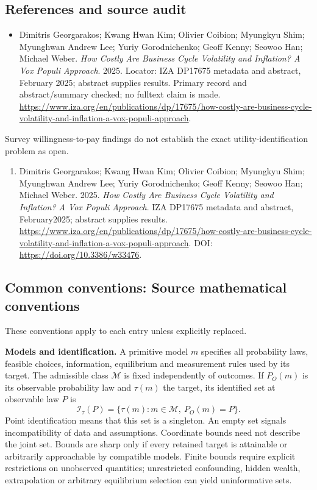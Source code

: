 \documentclass[11pt,a4paper]{article}
\begin{document}
\subsection*{References and source audit}
\begin{itemize}
\item Dimitris Georgarakos; Kwang Hwan Kim; Olivier Coibion; Myungkyu Shim; Myunghwan Andrew Lee; Yuriy Gorodnichenko; Geoff Kenny; Seowoo Han; Michael Weber. \emph{How Costly Are Business Cycle Volatility and Inflation? A Vox Populi Approach}. 2025. Locator: IZA DP17675 metadata and abstract, February 2025; abstract supplies results. Primary record and abstract/summary checked; no fulltext claim is made. \url{https://www.iza.org/en/publications/dp/17675/how-costly-are-business-cycle-volatility-and-inflation-a-vox-populi-approach}.
\end{itemize}
Survey willingness-to-pay findings do not establish the exact utility-identification problem as open.
\begin{enumerate}\raggedright
\item\hypertarget{definitions:source:30007518:1}{} Dimitris Georgarakos; Kwang Hwan Kim; Olivier Coibion; Myungkyu Shim; Myunghwan Andrew Lee; Yuriy Gorodnichenko; Geoff Kenny; Seowoo Han; Michael Weber. 2025. \emph{How Costly Are Business Cycle Volatility and Inflation? A Vox Populi Approach}. IZA DP17675 metadata and abstract, February2025; abstract supplies results.
\url{https://www.iza.org/en/publications/dp/17675/how-costly-are-business-cycle-volatility-and-inflation-a-vox-populi-approach}.
DOI: \url{https://doi.org/10.3386/w33476}.
\end{enumerate}

\subsection*{Common conventions: Source mathematical conventions}

These conventions apply to each entry unless explicitly replaced.

\textbf{Models and identification.} A primitive model \(m\) specifies all probability laws, feasible choices, information, equilibrium and measurement rules used by its target. The admissible class \(\mathcal M\) is fixed independently of outcomes. If \(P_O(m)\) is its observable probability law and \(\tau(m)\) the target, its identified set at observable law \(P\) is
\[
 \mathcal I_\tau(P)=\{\tau(m):m\in\mathcal M,\ P_O(m)=P\}.
\]
Point identification means that this set is a singleton. An empty set signals incompatibility of data and assumptions. Coordinate bounds need not describe the joint set. Bounds are sharp only if every retained target is attainable or arbitrarily approachable by compatible models. Finite bounds require explicit restrictions on unobserved quantities; unrestricted confounding, hidden wealth, extrapolation or arbitrary equilibrium selection can yield uninformative sets.
\end{document}
